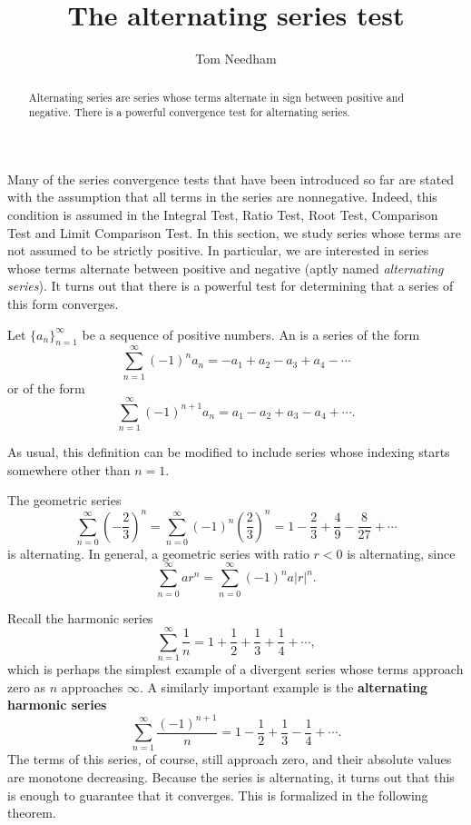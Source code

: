 \documentclass{ximera}
\title[Dig-In:]{The alternating series test}
\author{Tom Needham}
\begin{document}
\begin{abstract}
Alternating series are series whose terms alternate in sign between positive and negative. There is a powerful convergence test for alternating series. 
\end{abstract}
\maketitle

Many of the series convergence tests that have been introduced so far are stated with the assumption that all terms in the series are nonnegative. Indeed, this condition is assumed in the Integral Test, Ratio Test, Root Test, Comparison Test and Limit Comparison Test. In this section, we study series whose terms are not assumed to be strictly positive. In particular, we are interested in series whose terms alternate between positive and negative (aptly named \emph{alternating series}). It turns out that there is a powerful test for determining that a series of this form converges. 

\begin{definition}
Let $\{a_n\}_{n=1}^\infty$ be a sequence of positive numbers. An  is
a series of the form 
\[
\sum_{n=1}^\infty (-1)^n a_n = -a_1 + a_2 - a_3 + a_4 - \cdots
\]
or of the form
$$
\sum_{n=1}^\infty (-1)^{n+1}a_n = a_1 - a_2 + a_3 - a_4 + \cdots.
$$

As usual, this definition can be modified to include series whose indexing starts somewhere other than $n=1$. 
\end{definition}

\begin{example}
The geometric series
$$
\sum_{n=0}^\infty \left(-\frac{2}{3}\right)^n = \sum_{n=0}^\infty \left(-1\right)^n \left(\frac{2}{3}\right)^n = 1 - \frac{2}{3} + \frac{4}{9} - \frac{8}{27} + \cdots
$$
is alternating. In general, a geometric series with ratio $r < 0$ is alternating, since
$$
\sum_{n=0}^\infty a r^n = \sum_{n=0}^\infty (-1)^n a  |r|^n.
$$
\end{example}

\begin{example}
Recall the harmonic series
$$
\sum_{n=1}^\infty \frac{1}{n} = 1 + \frac{1}{2} + \frac{1}{3} + \frac{1}{4} + \cdots,
$$
which is perhaps the simplest example of a divergent series whose terms approach zero as $n$ approaches $\infty$. 
A similarly important example is the \textbf{alternating harmonic series}
$$
\sum_{n=1}^\infty \frac{(-1)^{n+1}}{n} = 1 - \frac{1}{2} + \frac{1}{3} - \frac{1}{4} + \cdots.
$$
The terms of this series, of course, still approach zero, and their absolute values are monotone decreasing. Because the series is alternating, it turns out that this is enough to guarantee that it converges. This is formalized in the following theorem.
\end{example}
\end{document}
